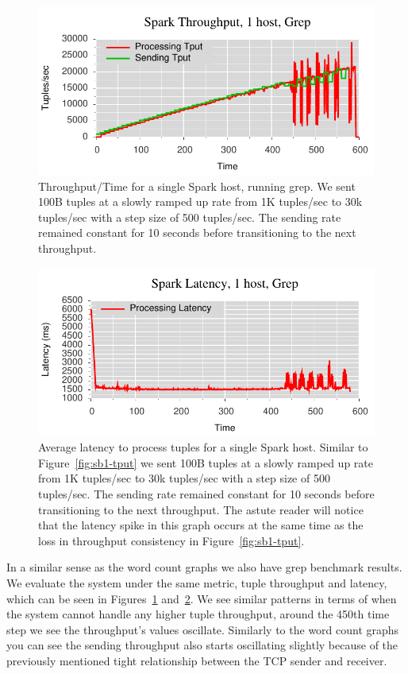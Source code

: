 \begin{figure}[t]
\centering
\includegraphics[width=1\linewidth]{figures/sp2_tput.pdf}
\caption{Throughput/Time for a single Spark host, running grep. We sent 100B tuples at a
slowly ramped up rate from 1K tuples/sec to 30k tuples/sec with a step size of
500 tuples/sec. The sending rate remained constant for 10 seconds before
transitioning to the next throughput.}
\label{fig:sp2-tput}
\end{figure}

\begin{figure}[t]
\centering
\includegraphics[width=1\linewidth]{figures/sp2_latency.pdf}
\caption{Average latency to process tuples for a single Spark host. Similar to
Figure~\ref{fig:sb1-tput} we sent 100B tuples at a slowly ramped up rate from 1K
tuples/sec to 30k tuples/sec with a step size of 500 tuples/sec. The sending
rate remained constant for 10 seconds before transitioning to the next
throughput. The astute reader will notice that the latency spike in this graph
occurs at the same time as the loss in throughput consistency in
Figure~\ref{fig:sb1-tput}.}
\label{fig:sp2-latency}
\end{figure}

In a similar sense as the word count graphs we also have grep benchmark
results.  We evaluate the system under the same metric, tuple throughput and
latency, which can be seen in Figures~\ref{fig:sp2-tput}
and~\ref{fig:sp2-latency}. We see similar patterns in terms of when the system
cannot handle any higher tuple throughput, around the 450th time step we see
the throughput's values oscillate. Similarly to the word count graphs you can
see the sending throughput also starts oscillating slightly because of the
previously mentioned tight relationship between the TCP sender and receiver.

